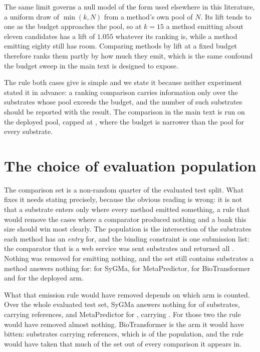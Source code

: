 \documentclass[journal=jcisd8,manuscript=suppinfo,layout=onecolumn]{achemso}
\begin{document}
The same limit governs a null model of the form used elsewhere in this literature, a uniform draw
of $\min(k, N)$ from a method's own pool of $N$.
Its lift tends to one as the budget approaches
the pool, so at $k=15$ a method emitting about eleven candidates has a lift of $1.055$ whatever
its ranking is, while a method emitting eighty still has room. Comparing methods by lift at a
fixed budget therefore ranks them partly by how much they emit, which is the same confound the
budget sweep in the main text is designed to expose.

The rule both cases give is simple and we state it because neither experiment stated it in
advance: a ranking comparison carries information only over the substrates whose pool exceeds the
budget, and the number of such substrates should be reported with the result.
The comparison in
the main text is run on the deployed pool, capped at \numCaseExhCandidates{}, where the budget is
narrower than the pool for every substrate.

\section{The choice of evaluation population}
\label{sec:si-population}

The comparison set is a non-random quarter of the evaluated test split. What fixes
it needs stating precisely, because the obvious reading is wrong: it is not that a substrate
enters only where every method emitted something, a rule that would remove the cases where a
comparator produced nothing and a bank this size should win most clearly. The population is the
intersection of the substrates each method has an \emph{entry} for, and the binding constraint is
one submission list: the comparator that is a web service was sent
\numPopulationN{} substrates and returned all \numPopulationN{}. Nothing was removed for emitting
nothing, and the set still contains substrates a method answers nothing for:
\numPopdefSygmainsideWord{} for SyGMa, \numPopdefMetapredictorinsideWord{} for MetaPredictor,
\numPopdefBtinside{} for BioTransformer and \numPopdefGrailinsideWord{} for the deployed arm.

What that emission rule would have removed depends on which arm is counted. Over the whole
evaluated test set, SyGMa answers nothing for \numPopdefSygmasilent{} of
\numPopulationTestsubs{} substrates, carrying \numPopdefSygmasilentrefs{} references, and
MetaPredictor for \numPopdefMetapredictorsilent{}, carrying
\numPopdefMetapredictorsilentrefs{}. For those two the rule would have removed almost nothing.
BioTransformer is the arm it would have bitten: \numPopdefBtsilent{} substrates carrying
\numPopdefBtsilentrefs{} references, which is \numPopdefBtsilentsharePct{} of the population, and
the rule would have taken that much of the set out of every comparison it appears in.
\end{document}
